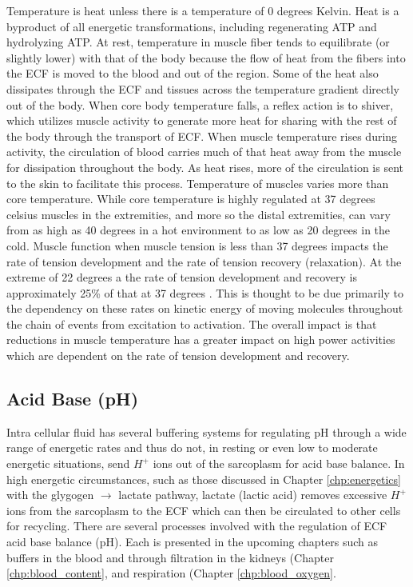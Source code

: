 Temperature is heat unless there is a temperature of 0 degrees Kelvin. Heat is a byproduct of all energetic transformations, including regenerating ATP and hydrolyzing ATP. At rest, temperature in muscle fiber tends to equilibrate (or slightly lower) with that of the body because the flow of heat from the fibers into the ECF is moved to the blood and out of the region. Some of the heat also dissipates through the ECF and tissues across the temperature gradient directly out of the body. When core body temperature falls, a reflex action is to shiver, which utilizes muscle activity to generate more heat for sharing with the rest of the body through the transport of ECF. When muscle temperature rises during activity, the circulation of blood carries much of that heat away from the muscle for dissipation throughout the body. As heat rises, more of the circulation is sent to the skin to facilitate this process.
Temperature of muscles varies more than core temperature. While core temperature is highly regulated at 37 degrees celsius muscles in the extremities, and more so the distal extremities, can vary from as high as 40 degrees in a hot environment to as low as 20 degrees in the cold. Muscle function when muscle tension is less than 37 degrees impacts the rate of tension development and the rate of tension recovery (relaxation). At the extreme of 22 degrees a the rate of tension development and recovery is approximately 25\% of that at 37 degrees \cite{jones_skeletal_2006}. This is thought to be due primarily to the dependency on these rates on kinetic energy of moving molecules throughout the chain of events from excitation to activation. The overall impact is that reductions in muscle temperature has a greater impact on high power activities which are dependent on the rate of tension development and recovery.

\subsection{Acid Base (pH)}

Intra cellular fluid has several buffering systems for regulating pH through a wide range of energetic rates and thus do not, in resting or even low to moderate energetic situations, send $H^+$ ions out of the sarcoplasm for acid base balance. In high energetic circumstances, such as those discussed in Chapter \ref{chp:energetics} with the glygogen $\rightarrow$ lactate pathway, lactate (lactic acid) removes excessive $H^+$ ions from the sarcoplasm to the ECF which can then be circulated to other cells for recycling.
There are several processes involved with the regulation of ECF acid base balance (pH). Each is presented in the upcoming chapters such as buffers in the blood and through filtration in the kidneys (Chapter \ref{chp:blood_content}, and respiration (Chapter \ref{chp:blood_oxygen}.


